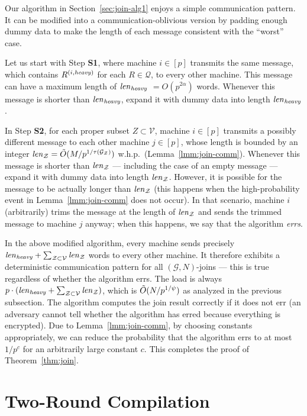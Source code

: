 \documentclass[sigconf]{acmart}
\def\vgap{\vspace{0mm}}
\def\G{\mathcal{G}}
\def\Q{\mathcal{Q}}
\def\V{\mathcal{V}}
\def\Z{\mathcal{Z}}
\def\heavy{\mit{heavy}}
\begin{document}
Our algorithm in Section~\ref{sec:join-alg1} enjoys a simple communication pattern. It can be modified into a communication-oblivious version by padding enough dummy data to make the length of each message consistent with the ``worst'' case.

\vgap

Let us start with Step {\bf S1}, where machine $i \in [p]$ transmits the same message, which contains $R^{(i,\heavy)}$ for each $R \in \Q$, to every other machine. This message can have a maximum length of $\mit{len}_\mit{heavy}$ $= O(p^{2\alpha})$ words. Whenever this message is shorter than $\mit{len}_\mit{heavy}$, expand it with dummy data into length $\mit{len}_\mit{heavy}$.

\vgap

In Step {\bf S2}, for each proper subset $Z \subset \V$, machine $i \in [p]$ transmits a possibly different message to each other machine $j \in [p]$, whose length is bounded by an integer $\mit{len}_\Z = \tO(M/p^{1/\tau(\G_\Z)})$ w.h.p.\ (Lemma~\ref{lmm:join-comm}). Whenever this message is shorter than $\mit{len}_\Z$ --- including the case of an empty message --- expand it with dummy data into length $\mit{len}_\Z$. However, it is possible for the message to be actually longer than $\mit{len}_\Z$ (this happens when the high-probability event in Lemma~\ref{lmm:join-comm} does not occur). In that scenario, machine $i$ (arbitrarily) trims the message at the length of $\mit{len}_\Z$ and sends the trimmed message to machine $j$ anyway; when this happens, we say that the algorithm {\em errs}.

\vgap

In the above modified algorithm, every machine sends precisely $\mit{len}_\mit{heavy} + \sum_{\Z \subset \V} \mit{len}_\Z$ words to every other machine. It therefore exhibits a deterministic communication pattern for all $(\G,N)$-joins --- this is true regardless of whether the algorithm errs. The load is always $p \cdot (\mit{len}_\mit{heavy} + \sum_{\Z \subset \V} \mit{len}_\Z)$, which is $\tO(N/p^{1/\psi})$ as analyzed in the previous subsection. The algorithm computes the join result correctly if it does not err (an adversary cannot tell whether the algorithm has erred because everything is encrypted). Due to Lemma~\ref{lmm:join-comm}, by choosing constants appropriately, we can reduce the probability that the algorithm errs to at most $1/p^c$ for an arbitrarily large constant $c$. This completes the proof of Theorem~\ref{thm:join}.

\section{Two-Round Compilation} \label{sec:compile}
\end{document}
